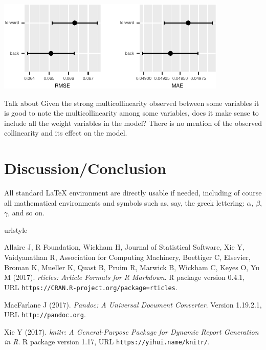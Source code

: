 \documentclass[letterpaper,9pt,twocolumn,twoside,]{pinp}
\begin{document}
\begin{center}\includegraphics{ExecSum_files/figure-latex/unnamed-chunk-8-1} \end{center}

Talk about Given the strong multicollinearity observed between some
variables it is good to note the multicollinearity among some variables,
does it make sense to include all the weight variables in the model?
There is no mention of the observed collinearity and its effect on the
model.

\section{Discussion/Conclusion}\label{discussionconclusion}

All standard LaTeX environment are directly usable if needed, including
of course all mathematical environments and symbols such as, say, the
greek lettering: \(\alpha\), \(\beta\), \(\gamma\), and so on.


\pnasbreak 



\begin{thebibliography}{3}
\newcommand{\enquote}[1]{``#1''}
\providecommand{\natexlab}[1]{#1}
\providecommand{\url}[1]{\texttt{#1}}
\providecommand{\urlprefix}{URL }
\expandafter\ifx\csname urlstyle\endcsname\relax
  \providecommand{\doi}[1]{doi:\discretionary{}{}{}#1}\else
  \providecommand{\doi}{doi:\discretionary{}{}{}\begingroup
  \urlstyle{rm}\Url}\fi
\providecommand{\eprint}[2][]{\url{#2}}

Allaire J, {R Foundation}, Wickham H, {Journal of Statistical Software}, Xie Y,
  Vaidyanathan R, {Association for Computing Machinery}, Boettiger C,
  {Elsevier}, Broman K, Mueller K, Quast B, Pruim R, Marwick B, Wickham C,
  Keyes O, Yu M (2017).
\newblock \emph{rticles: Article Formats for R Markdown}.
\newblock R package version 0.4.1,
  \urlprefix\url{https://CRAN.R-project.org/package=rticles}.

MacFarlane J (2017).
\newblock \emph{Pandoc: A Universal Document Converter}.
\newblock Version 1.19.2.1, \urlprefix\url{http://pandoc.org}.

Xie Y (2017).
\newblock \emph{knitr: A General-Purpose Package for Dynamic Report Generation
  in R}.
\newblock R package version 1.17, \urlprefix\url{https://yihui.name/knitr/}.

\end{thebibliography}
\end{document}
